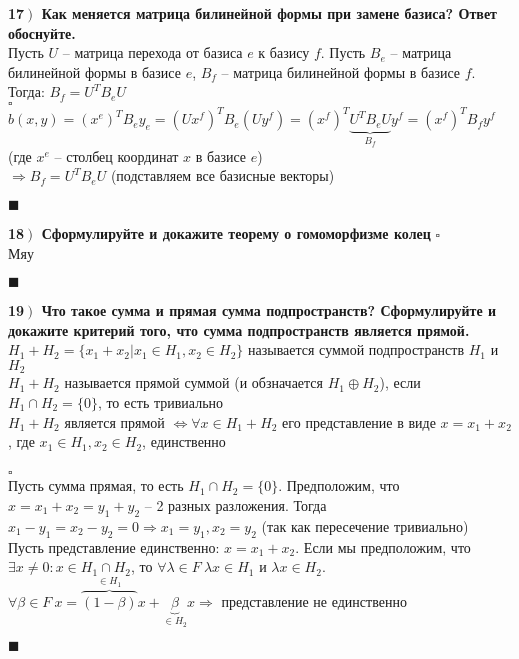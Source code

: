 \documentclass[a4paper,12pt]{article}
\begin{document}
    \textbf{17$\left.\right)$ Как меняется матрица билинейной формы при замене базиса? Ответ обоснуйте.}\\Пусть $U$ -- матрица перехода от базиса $e$ к базису $f$. Пусть $B_e$ -- матрица билинейной формы в базисе $e$, $B_f$ -- матрица билинейной формы в базисе $f$. Тогда: $B_f=U^TB_eU$\\
    $\square$\\
    $b(x, y)=(x^e)^TB_ey_e=(Ux^f)^TB_e(Uy^f)=(x^f)^T\underbrace{U^TB_eU}_{B_f}y^f=(x^f)^TB_fy^f$ (где $x^e$ -- столбец координат  $x$  в базисе $e$)\\
    $\Rightarrow B_f=U^TB_eU$ (подставляем все базисные векторы)
    \begin{flushright}
        $\blacksquare$
    \end{flushright}

    \textbf{18$\left.\right)$ Сформулируйте и докажите теорему о гомоморфизме колец}
    $\square$\\
    Мяу
    \begin{flushright}
        $\blacksquare$
    \end{flushright}

    \textbf{19$\left.\right)$ Что такое сумма и прямая сумма подпространств? Сформулируйте и докажите критерий того, что сумма подпространств является прямой.}\\ $H_1+H_2=\{x_1+x_2|x_1\in H_1, x_2\in H_2 \}$ называется суммой подпространств $H_1$ и $H_2$ \\$H_1+H_2$ называется прямой суммой (и обзначается $H_1\oplus H_2$), если $H_1\cap H_2=\{0\}$, то есть тривиально\\$H_1+H_2$ является прямой $\Leftrightarrow \forall x\in H_1+H_2$ его представление в виде $x=x_1+x_2$, где $x_1\in H_1, x_2\in H_2$, единственно\\ \\
    $\square$\\
    \fbox{$\Rightarrow$} Пусть сумма прямая, то есть $H_1\cap H_2=\{0\}$. Предположим, что $x=x_1+x_2=y_1+y_2$ -- 2 разных разложения. Тогда $x_1-y_1=x_2-y_2=0\Rightarrow x_1=y_1, x_2=y_2$ (так как пересечение тривиально)\\
    \fbox{$\Leftarrow$} Пусть представление единственно: $x=x_1+x_2$. Если мы предположим, что $\exists x\ne 0:x\in H_1\cap H_2$, то $\forall \lambda\in F\ \lambda x\in H_1$ и $\lambda x\in H_2$. $\forall \beta\in F\ x=\overbrace{(1-\beta)}^{\in H_1}x+\underbrace{\beta}_{\in H_2} x\Rightarrow$ представление не единственно
    \begin{flushright}
        $\blacksquare$
    \end{flushright}
\end{document}
